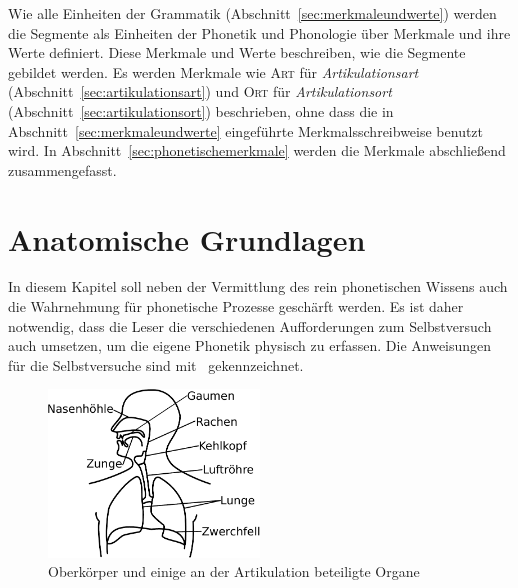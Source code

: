 
Wie alle Einheiten der Grammatik (Abschnitt~\ref{sec:merkmaleundwerte}) werden die Segmente als Einheiten der Phonetik und Phonologie über Merkmale und ihre Werte definiert.
Diese Merkmale und Werte beschreiben, wie die Segmente gebildet werden.
Es werden Merkmale wie \textsc{Art} für \textit{Artikulationsart} (Abschnitt~\ref{sec:artikulationsart}) und \textsc{Ort} für \textit{Artikulationsort} (Abschnitt~\ref{sec:artikulationsort}) beschrieben, ohne dass die in Abschnitt~\ref{sec:merkmaleundwerte} eingeführte Merkmalsschreibweise benutzt wird.
In Abschnitt~\ref{sec:phonetischemerkmale} werden die Merkmale abschließend zusammengefasst.




\section{Anatomische Grundlagen}

\label{sec:anatomischegrundlagen}

In diesem Kapitel soll neben der Vermittlung des rein phonetischen Wissens auch die Wahrnehmung für phonetische Prozesse geschärft werden.
Es ist daher notwendig, dass die Leser die verschiedenen Aufforderungen zum Selbstversuch auch umsetzen, um die eigene Phonetik physisch zu erfassen.
Die Anweisungen für die Selbstversuche sind mit \TuBegin\ gekennzeichnet.

\begin{figure}[!htbp]
  \centering
  \includegraphics[width=0.5\textwidth]{figures/ueberblick}
  \caption{Oberkörper und einige an der Artikulation beteiligte Organe}
  \label{fig:lunge}
\end{figure}

